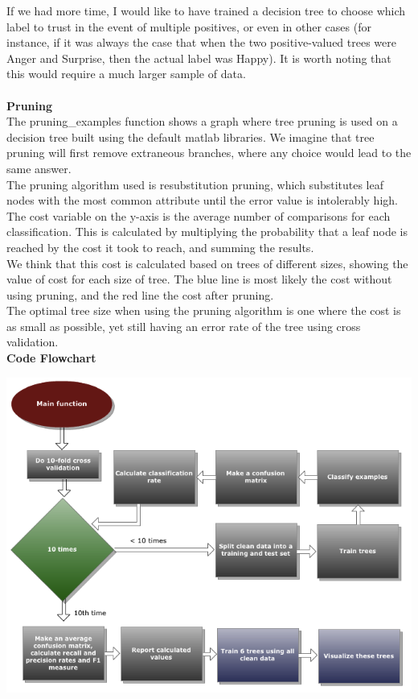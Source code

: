 \documentclass[12pt]{article}
\begin{document}
If we had more time, I would like to have trained a decision tree to choose which label to trust in the event of multiple positives, or even in other cases (for instance, if it was always the case that when the two positive-valued trees were Anger and Surprise, then the actual label was Happy). It is worth noting that this would require a much larger sample of data. \\ \\

{\bf Pruning} \\

The pruning\_examples function shows a graph where tree pruning is used on a decision tree built using the default matlab libraries. We imagine that tree pruning will first remove extraneous branches, where any choice would lead to the same answer. \\

The pruning algorithm used is resubstitution pruning, which substitutes leaf nodes with the most common attribute until the error value is intolerably high. \\

The cost variable on the y-axis is the average number of comparisons for each classification. This is calculated by multiplying the probability that a leaf node is reached by the cost it took to reach, and summing the results. \\

We think that this cost is calculated based on trees of different sizes, showing the value of cost for each size of tree. The blue line is most likely the cost without using pruning, and the red line the cost after pruning. \\

The optimal tree size when using the pruning algorithm is one where the cost is as small as possible, yet still having an error rate of the tree using cross validation. \\

{\bf Code Flowchart} \\
\begin{center}
  \includegraphics[scale=0.6]{report-images/flowchart.png}
\end{center}
\end{document}
